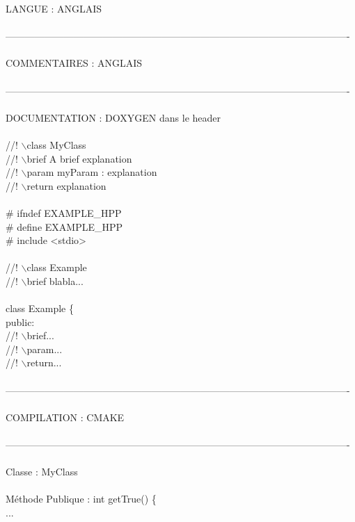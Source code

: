 

LANGUE : ANGLAIS
\\ \\
----------------------------------------------------------------------------------------------------------
\\ \\
COMMENTAIRES : ANGLAIS
\\ \\
----------------------------------------------------------------------------------------------------------
\\ \\
DOCUMENTATION : DOXYGEN dans le header
\\ \\
//! $\backslash$class MyClass
\\
//! $\backslash$brief A  brief explanation
\\
//! $\backslash$param myParam : explanation
\\
//! $\backslash$return explanation
\\ \\
\# ifndef EXAMPLE\_HPP\\
\# define EXAMPLE\_HPP\\
\# include <stdio>
\\ \\
//! $\backslash$class Example \\
//! $\backslash$brief blabla...
\\ \\
class Example \{\\
	public:\\
	//! $\backslash$brief... \\
	//! $\backslash$param... \\
	//! $\backslash$return...
\\ \\
----------------------------------------------------------------------------------------------------------
\\ \\
COMPILATION : CMAKE
\\ \\
----------------------------------------------------------------------------------------------------------
\\ \\
Classe : MyClass
\\ \\
Méthode Publique : int getTrue() \{ \\
		   ... \\
